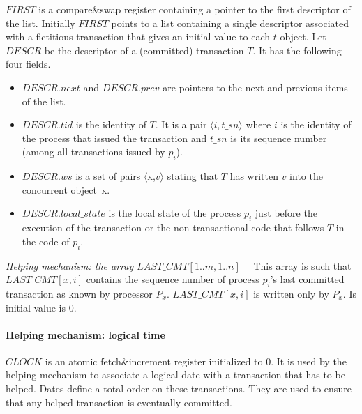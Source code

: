 $\mathit{FIRST}$ is a compare\&swap register containing  a pointer to the
first descriptor of the list. Initially $\mathit{FIRST}$ points to a  list 
containing a single descriptor associated with a fictitious transaction that
gives an  initial value to  each $t$-object. 
Let $\mathit{DESCR}$ be the descriptor of a (committed) transaction
$T$. It has  the following four fields.
\begin{itemize}
\item 
$\mathit{DESCR}.next$ and $\mathit{DESCR}.prev$ are pointers to the next 
and previous items of the list.
%
\item 
$\mathit{DESCR}.tid$ is the identity of $T$. It is a pair 
$\langle i,t\_sn \rangle $ where $i$ is the identity of the process 
that issued the transaction and  $t\_sn$ is its sequence number (among all
transactions issued by $p_i$). 
%
\item 
$\mathit{DESCR}.ws$ is a set of pairs $\langle${\sc x},$v \rangle$ 
stating that $T$  has written $v$ into the concurrent  object~{\sc x}. 
%
\item $\mathit{DESCR}.local\_state$ is the local state of the process $p_i$ 
just before the  execution of  the transaction or the non-transactional code that follows $T$ in the code of $p_i$.
\end{itemize}



\noindent
{\it Helping mechanism: the array $\mathit{LAST\_CMT}[1..m,1..n]$}~~
This array  is  such that $\mathit{LAST\_CMT}[x,i]$ contains the sequence   
number of process $p_i$'s  last committed transaction as known by processor $P_x$. 
$\mathit{LAST\_CMT}[x,i]$ is written only  by $P_x$. Is initial value is $0$.   


\paragraph{Helping mechanism: logical time}
$\mathit{CLOCK}$ is an atomic fetch\&increment register initialized 
to $0$.  It is used by the  helping mechanism to associate a logical date
with a  transaction that has to be  helped. Dates define a total  order 
on these transactions. They are used to ensure 
that any helped  transaction is  eventually  committed. 



